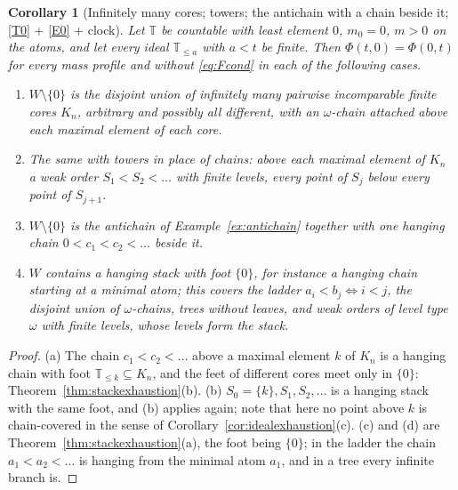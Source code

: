 \documentclass[11pt,a4paper]{article}
\theoremstyle{plain}
\newtheorem{corollary}[theorem]{Corollary}
\theoremstyle{definition}
\theoremstyle{remark}
\newcommand{\T}{\mathbb{T}}                     %
\begin{document}
\begin{corollary}[Infinitely many cores; towers; the antichain with a chain beside it; \eqref{T0} + \eqref{E0} + clock]
  \label{cor:stackexhaustion}
  Let $\T$ be countable with least element $0$, $m_0 = 0$, $m > 0$ on the
  atoms, and let every ideal $\T_{\leq a}$ with $a < t$ be finite.  Then
  $\Phi(t,0) = \Phi(0,t)$ for every mass profile and without
  \eqref{eq:Fcond} in each of the following cases.
  \begin{enumerate}[label=(\alph*)]
  \item $W \setminus \{0\}$ is the disjoint union of infinitely many pairwise
    incomparable finite cores $K_n$, arbitrary and possibly all different,
    with an $\omega$-chain attached above each maximal element of each core.
  \item The same with \emph{towers} in place of chains: above each maximal
    element of $K_n$ a weak order $S_1 < S_2 < \dots$ with finite levels,
    every point of $S_j$ below every point of $S_{j+1}$.
  \item $W \setminus \{0\}$ is the antichain of Example~\ref{ex:antichain}
    together with one hanging chain $0 < c_1 < c_2 < \dots$ beside it.
  \item $W$ contains a hanging stack with foot $\{0\}$, for instance a
    hanging chain starting at a minimal atom; this covers the ladder
    $a_i < b_j \iff i < j$, the disjoint union of $\omega$-chains, trees
    without leaves, and weak orders of level type $\omega$ with finite
    levels, whose levels form the stack.
  \end{enumerate}
\end{corollary}

\begin{proof}
  (a) The chain $c_1 < c_2 < \dots$ above a maximal element $k$ of $K_n$ is a
  hanging chain with foot $\T_{\leq k} \subseteq K_n$, and the feet of
  different cores meet only in $\{0\}$: Theorem~\ref{thm:stackexhaustion}(b).
  (b) $S_0 = \{k\}, S_1, S_2, \dots$ is a hanging stack with the same foot,
  and (b) applies again; note that here no point above $k$ is chain-covered
  in the sense of Corollary~\ref{cor:idealexhaustion}(c).  (c) and (d) are
  Theorem~\ref{thm:stackexhaustion}(a), the foot being $\{0\}$; in the
  ladder the chain $a_1 < a_2 < \dots$ is hanging from the minimal atom
  $a_1$, and in a tree every infinite branch is.
\end{proof}
\end{document}
